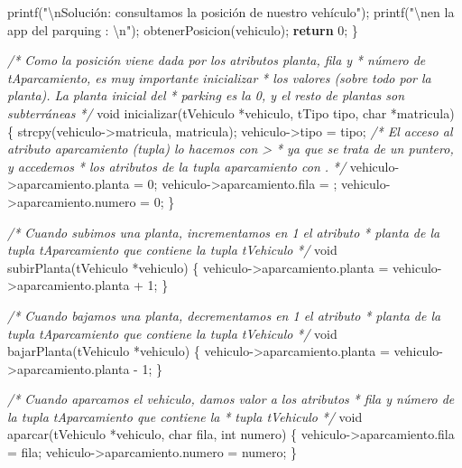 \documentclass[
]{book}
\newenvironment{Shaded}{\begin{snugshade}}{\end{snugshade}}
\newcommand{\CharTok}[1]{\textcolor[rgb]{0.31,0.60,0.02}{#1}}
\newcommand{\CommentTok}[1]{\textcolor[rgb]{0.56,0.35,0.01}{\textit{#1}}}
\newcommand{\ControlFlowTok}[1]{\textcolor[rgb]{0.13,0.29,0.53}{\textbf{#1}}}
\newcommand{\DataTypeTok}[1]{\textcolor[rgb]{0.13,0.29,0.53}{#1}}
\newcommand{\DecValTok}[1]{\textcolor[rgb]{0.00,0.00,0.81}{#1}}
\newcommand{\NormalTok}[1]{#1}
\newcommand{\SpecialCharTok}[1]{\textcolor[rgb]{0.00,0.00,0.00}{#1}}
\newcommand{\StringTok}[1]{\textcolor[rgb]{0.31,0.60,0.02}{#1}}
\begin{document}
\begin{Shaded}
\begin{Highlighting}[]
\NormalTok{    printf(}\StringTok{"}\SpecialCharTok{\textbackslash{}n}\StringTok{Solución: consultamos la posición de nuestro vehículo"}\NormalTok{);}
\NormalTok{    printf(}\StringTok{"}\SpecialCharTok{\textbackslash{}n}\StringTok{en la app del parquing : }\SpecialCharTok{\textbackslash{}n}\StringTok{"}\NormalTok{);}
\NormalTok{    obtenerPosicion(vehiculo);}
    \ControlFlowTok{return} \DecValTok{0}\NormalTok{;}
\NormalTok{\}}

\CommentTok{/* Como la posición viene dada por los atributos planta, fila y}
\CommentTok{ * número de tAparcamiento, es muy importante inicializar}
\CommentTok{ * los valores (sobre todo por la planta). La planta inicial del}
\CommentTok{ * parking es la 0, y el resto de plantas son subterráneas}
\CommentTok{ */}
\DataTypeTok{void}\NormalTok{ inicializar(tVehiculo *vehiculo, tTipo tipo, }\DataTypeTok{char}\NormalTok{ *matricula) \{}
\NormalTok{    strcpy(vehiculo{-}\textgreater{}matricula, matricula);}
\NormalTok{    vehiculo{-}\textgreater{}tipo = tipo;}
    \CommentTok{/* El acceso al atributo aparcamiento (tupla) lo hacemos con \textquotesingle{}{-}\textgreater{}\textquotesingle{}}
\CommentTok{     * ya que se trata de un puntero, y accedemos}
\CommentTok{     * los atributos de la tupla aparcamiento con \textquotesingle{}.\textquotesingle{}}
\CommentTok{     */}
\NormalTok{    vehiculo{-}\textgreater{}aparcamiento.planta = }\DecValTok{0}\NormalTok{;}
\NormalTok{    vehiculo{-}\textgreater{}aparcamiento.fila = }\CharTok{\textquotesingle{}{-}\textquotesingle{}}\NormalTok{;}
\NormalTok{    vehiculo{-}\textgreater{}aparcamiento.numero = }\DecValTok{0}\NormalTok{;}
\NormalTok{\}}

\CommentTok{/* Cuando subimos una planta, incrementamos en 1 el atributo}
\CommentTok{ * planta de la tupla tAparcamiento que contiene la tupla tVehiculo}
\CommentTok{ */}
\DataTypeTok{void}\NormalTok{ subirPlanta(tVehiculo *vehiculo) \{}
\NormalTok{    vehiculo{-}\textgreater{}aparcamiento.planta = vehiculo{-}\textgreater{}aparcamiento.planta + }\DecValTok{1}\NormalTok{;}
\NormalTok{\}}

\CommentTok{/* Cuando bajamos una planta, decrementamos en 1 el atributo}
\CommentTok{ * planta de la tupla tAparcamiento que contiene la tupla tVehiculo}
\CommentTok{ */}
\DataTypeTok{void}\NormalTok{ bajarPlanta(tVehiculo *vehiculo) \{}
\NormalTok{    vehiculo{-}\textgreater{}aparcamiento.planta = vehiculo{-}\textgreater{}aparcamiento.planta {-} }\DecValTok{1}\NormalTok{;}
\NormalTok{\}}

\CommentTok{/* Cuando aparcamos el vehiculo, damos valor a los atributos}
\CommentTok{ * fila y número de la tupla tAparcamiento que contiene la}
\CommentTok{ * tupla tVehiculo}
\CommentTok{ */}
\DataTypeTok{void}\NormalTok{ aparcar(tVehiculo *vehiculo, }\DataTypeTok{char}\NormalTok{ fila, }\DataTypeTok{int}\NormalTok{ numero) \{}
\NormalTok{    vehiculo{-}\textgreater{}aparcamiento.fila = fila;}
\NormalTok{    vehiculo{-}\textgreater{}aparcamiento.numero = numero;}
\NormalTok{\}}


\end{Highlighting}
\end{Shaded}
\end{document}

